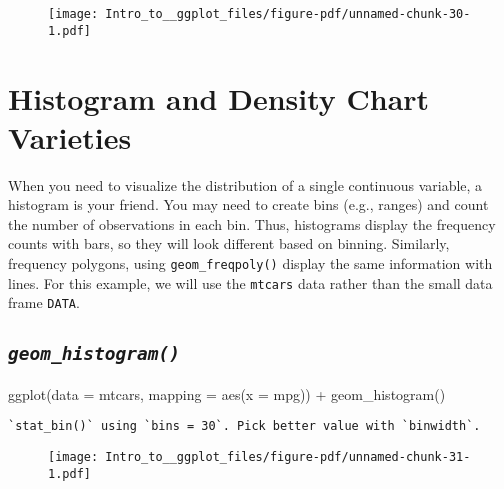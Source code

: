 \documentclass[
  letterpaper,
  DIV=11,
  numbers=noendperiod]{scrartcl}
\newenvironment{Shaded}{\begin{snugshade}}{\end{snugshade}}
\newcommand{\AttributeTok}[1]{\textcolor[rgb]{0.40,0.45,0.13}{#1}}
\newcommand{\FunctionTok}[1]{\textcolor[rgb]{0.28,0.35,0.67}{#1}}
\newcommand{\NormalTok}[1]{\textcolor[rgb]{0.00,0.23,0.31}{#1}}
\newcommand{\SpecialCharTok}[1]{\textcolor[rgb]{0.37,0.37,0.37}{#1}}
\begin{document}
\begin{figure}[H]

{\centering \texttt{[image: Intro\_to\_\_ggplot\_files/figure-pdf/unnamed-chunk-30-1.pdf]}

}

\end{figure}

\hypertarget{histogram-and-density-chart-varieties}{%
\section{\texorpdfstring{\textbf{Histogram and Density Chart
Varieties}}{Histogram and Density Chart Varieties}}\label{histogram-and-density-chart-varieties}}

When you need to visualize the distribution of a single continuous
variable, a histogram is your friend. You may need to create bins (e.g.,
ranges) and count the number of observations in each bin. Thus,
histograms display the frequency counts with bars, so they will look
different based on binning. Similarly, frequency polygons, using
\texttt{geom\_freqpoly()} display the same information with lines. For
this example, we will use the \texttt{mtcars} data rather than the small
data frame \texttt{DATA}.

\hypertarget{geom_histogram}{%
\subsection{\texorpdfstring{\emph{\texttt{geom\_histogram()}}}{geom\_histogram()}}\label{geom_histogram}}

\begin{Shaded}
\begin{Highlighting}[]
\FunctionTok{ggplot}\NormalTok{(}\AttributeTok{data =}\NormalTok{ mtcars, }
       \AttributeTok{mapping =} \FunctionTok{aes}\NormalTok{(}\AttributeTok{x =}\NormalTok{ mpg)) }\SpecialCharTok{+}
  \FunctionTok{geom\_histogram}\NormalTok{()}
\end{Highlighting}
\end{Shaded}

\begin{verbatim}
`stat_bin()` using `bins = 30`. Pick better value with `binwidth`.
\end{verbatim}

\begin{figure}[H]

{\centering \texttt{[image: Intro\_to\_\_ggplot\_files/figure-pdf/unnamed-chunk-31-1.pdf]}

}

\end{figure}
\end{document}
